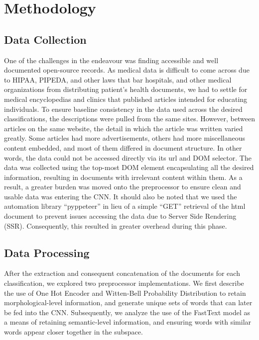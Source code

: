 \documentclass[12pt]{report}
\begin{document}
\chapter{Methodology}
\section{Data Collection}

One of the challenges in the endeavour was finding accessible and well
documented open-source records. As medical data is difficult to come across due
to HIPAA, PIPEDA, and other laws that bar hospitals, and other medical
organizations from distributing patient’s health documents, we had to settle
for medical encyclopedias and clinics that published articles intended for
educating individuals. To ensure baseline consistency in the data used across
the desired classifications, the descriptions were pulled from the same sites.
However, between articles on the same website, the detail in which the article
was written varied greatly. Some articles had more advertisements, others had
more miscellaneous content embedded, and most of them differed in document
structure. In other words, the data could not be accessed directly via its url
and DOM selector. The data was collected using the top-most DOM element
encapsulating all the desired information, resulting in documents with
irrelevant content within them.  As a result, a greater burden was moved onto
the preprocessor to ensure clean and usable data was entering the CNN. It
should also be noted that we used the automation library “pyppeteer” in lieu of
a simple “GET” retrieval of the html document to prevent issues accessing the
data due to Server Side Rendering (SSR). Consequently, this resulted in greater
overhead during this phase.

\section{Data Processing}

After the extraction and consequent concatenation of the documents for each
classification, we explored two preprocessor implementations. We first describe
the use of One Hot Encoder and Witten-Bell Probability Distribution to retain
morphological-level information, and generate unique sets of words that can
later be fed into the CNN. Subsequently, we analyze the use of the FastText
model as a means of retaining semantic-level information, and ensuring words
with similar words appear closer together in the subspace.
\end{document}
